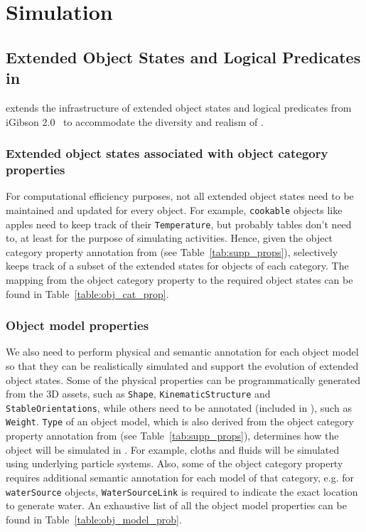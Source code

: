 \section{Simulation}

\subsection{Extended Object States and Logical Predicates in \simulator}
\label{as:object_states}
\simulator extends the infrastructure of extended object states and logical predicates from iGibson 2.0~\cite{li2021ig2} to accommodate the diversity and realism of \benchmark.

\subsubsection{Extended object states associated with object category properties}
For computational efficiency purposes, not all extended object states need to be maintained and updated for every object. For example, \texttt{cookable} objects like apples need to keep track of their \texttt{Temperature}, but probably tables don't need to, at least for the purpose of simulating \benchmark activities. Hence, given the object category property annotation from \dataset (see Table~\ref{tab:supp_props}), \simulator selectively keeps track of a subset of the extended states for objects of each category. The mapping from the object category property to the required object states can be found in Table~\ref{table:obj_cat_prop}.


\subsubsection{Object model properties}
We also need to perform physical and semantic annotation for each object model so that they can be realistically simulated and support the evolution of extended object states. Some of the physical properties can be programmatically generated from the 3D assets, such as \texttt{Shape}, \texttt{KinematicStructure} and  \texttt{StableOrientations}, while others need to be annotated (included in \dataset), such as \texttt{Weight}. \texttt{Type} of an object model, which is also derived from the object category property annotation from \dataset (see Table~\ref{tab:supp_props}), determines how the object will be simulated in \simulator. For example, cloths and fluids will be simulated using underlying particle systems. Also, some of the object category property requires additional semantic annotation for each model of that category, e.g. for \texttt{waterSource} objects, \texttt{WaterSourceLink} is required to indicate the exact location to generate water. An exhaustive list of all the object model properties can be found in Table~\ref{table:obj_model_prob}.


